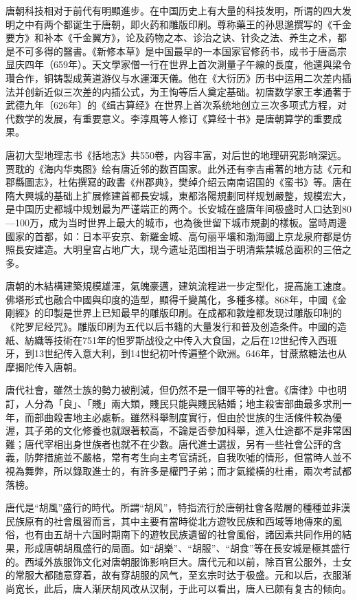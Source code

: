 唐朝科技相对于前代有明顯進步。在中国历史上有大量的科技发明，所谓的四大发明之中有两个都诞生于唐朝，即火药和雕版印刷。尊称藥王的孙思邈撰写的《千金要方》和补本《千金翼方》，论及药物之本、诊治之诀、针灸之法、养生之术，都是不可多得的醫書。《新修本草》是中国最早的一本国家官修药书，成书于唐高宗显庆四年（659年）。天文學家僧一行在世界上首次測量子午線的長度，他還與梁令瓚合作，铜铸製成黄道游仪与水運渾天儀。他在《大衍历》历书中运用二次差内插法并创新近似三次差的内插公式，为王恂等后人奠定基础。初唐数学家王孝通著于武德九年〔626年〕的《缉古算经》在世界上首次系统地创立三次多项式方程，对代数学的发展，有重要意义。李淳風等人修订《算经十书》是唐朝算学的重要成果。

唐初大型地理志书《括地志》共550卷，内容丰富，对后世的地理研究影响深远。贾耽的《海内华夷图》绘有唐近邻的数百国家。此外还有李吉甫著的地方誌《元和郡縣圖志》，杜佑撰寫的政書《州郡典》，樊绰介绍云南南诏国的《蛮书》等。唐在隋大興城的基础上扩展修建首都長安城，東都洛陽規劃同样规划嚴整，规模宏大，是中国历史都城中规划最为严谨端正的两个。长安城在盛唐年间极盛时人口达到80—100万，成为当时世界上最大的城市，也為後世留下城市規劃的樣板。當時周邊國家的首都，如：日本平安京、新羅金城、高句丽平壤和渤海國上京龙泉府都是仿照長安建造。大明皇宫占地广大，现今遗址范围相当于明清紫禁城总面积的三倍之多。

唐朝的木結構建築規模雄渾，氣魄豪邁，建筑流程进一步定型化，提高施工速度。佛塔形式也融合中國與印度的造型，顯得千變萬化，多種多樣。868年，中國《金剛經》的印製是世界上已知最早的雕版印刷。在成都和敦煌都发现过雕版印制的《陀罗尼经咒》。雕版印刷为五代以后书籍的大量发行和普及创造条件。中國的造紙、紡織等技術在751年的怛罗斯战役之中传入大食国，之后在12世纪传入西班牙，到13世纪传入意大利，到14世纪初叶传遍整个欧洲。646年，甘蔗熬糖法也从摩揭陀传入唐朝。

唐代社會，雖然士族的勢力被削減，但仍然不是一個平等的社會。《唐律》中也明訂，人分為「良」、「賤」兩大類，賤民只能與賤民結婚；地主殺害部曲最多求刑一年，而部曲殺害地主必處斬。雖然科舉制度實行，但由於世族的生活條件較為優渥，其子弟的文化修養也就跟著較高，不論是否參加科舉，進入仕途都不是非常困難；唐代宰相出身世族者也就不在少數。唐代進士選拔，另有一些社會公評的含義，防弊措施並不嚴格，常有考生向主考官請託，自我吹噓的情形，但當時人並不視為舞弊，所以錄取進士的，有許多是權門子弟；而才氣縱橫的杜甫，兩次考試都落榜。

唐代是“胡風”盛行的時代。所謂“胡风”，特指流行於唐朝社會各階層的種種並非漢民族原有的社會風習而言，其中主要有當時從北方遊牧民族和西域等地傳來的風俗，也有由五胡十六国时期南下的遊牧民族遺留的社會風俗，諸因素共同作用的結果，形成唐朝胡風盛行的局面。如“胡樂”、“胡服”、“胡食”等在長安城是極其盛行的。西域外族服饰文化对唐朝服饰影响巨大。唐代元和以前，除百官公服外，士女的常服大都随意穿着，故有穿胡服的风气，至玄宗时达于极盛。元和以后，衣服渐尚宽长，此后，唐人渐厌胡风改从汉制，于此可以看出，唐人已颇有复古的倾向。

